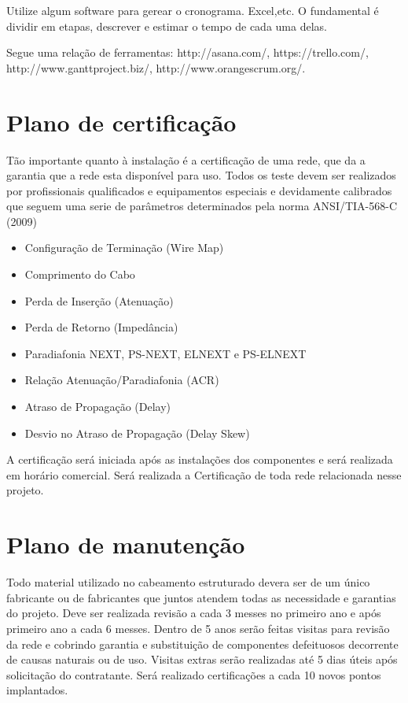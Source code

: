 \documentclass[	DIV=calc,%
							paper=a4,%
							fontsize=12pt,%
							onecolumn]{scrartcl}	 					%
\begin{document}
Utilize algum software para gerear o cronograma. Excel,etc. O fundamental é dividir em etapas, descrever e estimar o tempo de cada uma delas.

Segue uma relação de ferramentas:
http://asana.com/, 
https://trello.com/, 
http://www.ganttproject.biz/, 
http://www.orangescrum.org/. 

\section{Plano de certificação}
Tão importante quanto à instalação é a certificação de uma rede, que da a garantia que a rede esta disponível para uso. Todos os teste devem ser realizados por profissionais qualificados e equipamentos especiais e devidamente calibrados que seguem uma serie de parâmetros determinados pela norma  ANSI/TIA-568-C (2009)  

\begin{itemize}
\item Configuração de Terminação (Wire Map)
\item Comprimento do Cabo
\item Perda de Inserção (Atenuação)
\item Perda de Retorno (Impedância)
\item Paradiafonia NEXT, PS-NEXT, ELNEXT e PS-ELNEXT
\item Relação Atenuação/Paradiafonia (ACR)
\item Atraso de Propagação (Delay)
\item Desvio no Atraso de Propagação (Delay Skew)	
\end{itemize}

A certificação será iniciada após as instalações dos componentes e será realizada em horário comercial. Será realizada a Certificação de toda rede relacionada nesse projeto. 


\section{Plano de manutenção}
Todo material utilizado no cabeamento estruturado devera ser de um único fabricante ou de fabricantes que juntos atendem todas as necessidade e garantias do projeto.  
Deve ser realizada revisão a cada 3 messes no primeiro ano e após primeiro ano a cada 6 messes. 
Dentro de 5 anos serão feitas visitas para revisão da rede e cobrindo garantia e substituição de componentes defeituosos decorrente de causas naturais ou de uso. Visitas extras serão realizadas até 5 dias úteis após solicitação do contratante.  Será realizado certificações a cada 10 novos pontos implantados. 
\end{document}
